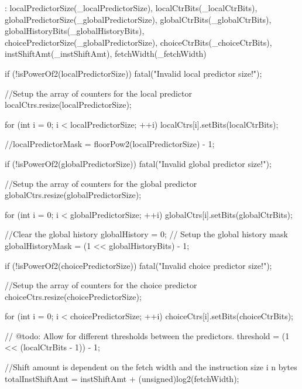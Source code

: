 \begin{DoxyCode}
    : localPredictorSize(_localPredictorSize),
      localCtrBits(_localCtrBits),
      globalPredictorSize(_globalPredictorSize),
      globalCtrBits(_globalCtrBits),
      globalHistoryBits(_globalHistoryBits),
      choicePredictorSize(_globalPredictorSize),
      choiceCtrBits(_choiceCtrBits),
      instShiftAmt(_instShiftAmt),
      fetchWidth(_fetchWidth)
{
    if (!isPowerOf2(localPredictorSize)) {
        fatal("Invalid local predictor size!\n");
    }

    //Setup the array of counters for the local predictor
    localCtrs.resize(localPredictorSize);

    for (int i = 0; i < localPredictorSize; ++i)
        localCtrs[i].setBits(localCtrBits);

    //localPredictorMask = floorPow2(localPredictorSize) - 1;

    if (!isPowerOf2(globalPredictorSize)) {
        fatal("Invalid global predictor size!\n");
    }

    //Setup the array of counters for the global predictor
    globalCtrs.resize(globalPredictorSize);

    for (int i = 0; i < globalPredictorSize; ++i)
        globalCtrs[i].setBits(globalCtrBits);

    //Clear the global history
    globalHistory = 0;
    // Setup the global history mask
    globalHistoryMask = (1 << globalHistoryBits) - 1;

    if (!isPowerOf2(choicePredictorSize)) {
        fatal("Invalid choice predictor size!\n");
    }

    //Setup the array of counters for the choice predictor
    choiceCtrs.resize(choicePredictorSize);

    for (int i = 0; i < choicePredictorSize; ++i)
        choiceCtrs[i].setBits(choiceCtrBits);

    // @todo: Allow for different thresholds between the predictors.
    threshold = (1 << (localCtrBits - 1)) - 1;

        //Shift amount is dependent on the fetch width and the instruction size i
      n bytes
        totalInstShiftAmt = instShiftAmt + (unsigned)log2(fetchWidth);
}
\end{DoxyCode}


